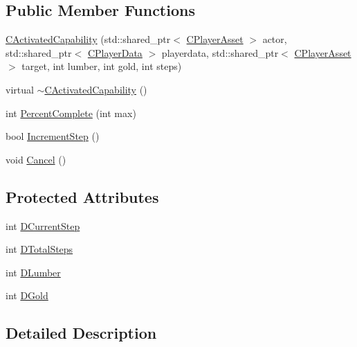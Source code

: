 \subsection*{Public Member Functions}
\begin{DoxyCompactItemize}
\item 
\hyperlink{classCPlayerCapabilityBuildNormal_1_1CActivatedCapability_a33a64e3a38d5e2e3c705d3350780a17a}{C\+Activated\+Capability} (std\+::shared\+\_\+ptr$<$ \hyperlink{classCPlayerAsset}{C\+Player\+Asset} $>$ actor, std\+::shared\+\_\+ptr$<$ \hyperlink{classCPlayerData}{C\+Player\+Data} $>$ playerdata, std\+::shared\+\_\+ptr$<$ \hyperlink{classCPlayerAsset}{C\+Player\+Asset} $>$ target, int lumber, int gold, int steps)
\item 
virtual \hyperlink{classCPlayerCapabilityBuildNormal_1_1CActivatedCapability_a68b7fdfbb1f47ac01fafc46acafa22b5}{$\sim$\+C\+Activated\+Capability} ()
\item 
int \hyperlink{classCPlayerCapabilityBuildNormal_1_1CActivatedCapability_a40bf27f9dfe88ad17a51ebb12c078568}{Percent\+Complete} (int max)
\item 
bool \hyperlink{classCPlayerCapabilityBuildNormal_1_1CActivatedCapability_a19b9ba979e8deebcb2b7e4225af47d2e}{Increment\+Step} ()
\item 
void \hyperlink{classCPlayerCapabilityBuildNormal_1_1CActivatedCapability_a7cc74f98f4071edfa75395d02d897fef}{Cancel} ()
\end{DoxyCompactItemize}
\subsection*{Protected Attributes}
\begin{DoxyCompactItemize}
\item 
int \hyperlink{classCPlayerCapabilityBuildNormal_1_1CActivatedCapability_ab6e20b5de47d912d9e38c2e8395f1ad1}{D\+Current\+Step}
\item 
int \hyperlink{classCPlayerCapabilityBuildNormal_1_1CActivatedCapability_a50e3103232671fc231348e7a86c1fed5}{D\+Total\+Steps}
\item 
int \hyperlink{classCPlayerCapabilityBuildNormal_1_1CActivatedCapability_acc7750973121c2b8ada035bca9264229}{D\+Lumber}
\item 
int \hyperlink{classCPlayerCapabilityBuildNormal_1_1CActivatedCapability_a8997bc10da71f5df340096cd0d717d84}{D\+Gold}
\end{DoxyCompactItemize}


\subsection{Detailed Description}



